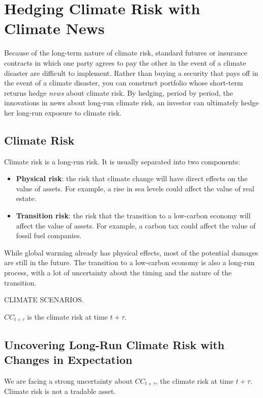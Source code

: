 \chapter{Hedging Climate Risk with Climate News}

Because of the long-term nature of climate risk,
standard futures or insurance 
contracts in which one party agrees 
to pay the other in the event of a climate 
disaster are difficult to implement. 
Rather than buying a security that pays off
in the event of a climate disaster, 
you can construct 
portfolio whose short-term returns hedge
\textit{news} about climate risk.
By hedging, period by period, the innovations 
in news about long-run climate risk, 
an investor can ultimately hedge her 
long-run exposure to climate risk.

\section{Climate Risk}

Climate risk is a long-run risk.
It is usually separated into two components:
\begin{itemize}
    \item \textbf{Physical risk}: the risk that 
    climate change will have direct effects on 
    the value of assets. For example, 
    a rise in sea levels could affect the value 
    of real estate.
    \item \textbf{Transition risk}: the risk that 
    the transition to a low-carbon economy will 
    affect the value of assets. For example, 
    a carbon tax could affect the value of 
    fossil fuel companies.
\end{itemize}

While global warming already has physical effects,
most of the potential damages are still in the future.
The transition to a low-carbon economy is also
a long-run process, with a lot of uncertainty
about the timing and the nature of the transition.

CLIMATE SCENARIOS.

$CC_{t+\tau}$ is the climate risk at time $t+\tau$.

\section{Uncovering Long-Run Climate Risk
with Changes in Expectation}

We are facing a strong uncertainty about 
$CC_{t+\tau}$, the climate risk at time $t+\tau$. 
Climate risk is not a tradable asset.

